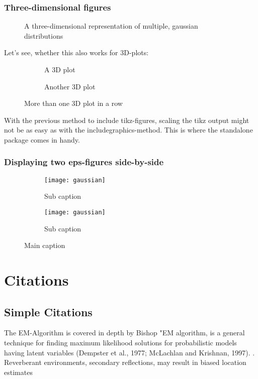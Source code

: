 \subsubsection{Three-dimensional figures}
\begin{figure}[H]
	\centering
	
	\caption{A three-dimensional representation of multiple, gaussian distributions}
	\label{fig:gaussian}
\end{figure}

Let's see, whether this also works for 3D-plots:

\begin{figure}[H]
	\centering
	\begin{subfigure}{0.49\textwidth}
		
		\caption{A 3D plot}
	\end{subfigure}
	\begin{subfigure}{0.49\textwidth}
		
		\caption{Another 3D plot}
	\end{subfigure}
	\caption{More than one 3D plot in a row}
	\label{fig:gaussian3}
\end{figure}

With the previous method to include tikz-figures, scaling the tikz output might not be as easy as with the includegraphics-method. This is where the standalone package comes in handy.

\subsubsection{Displaying two eps-figures side-by-side}
\begin{figure}[H]
 \centering
 \begin{subfigure}{0.49\textwidth}
    \texttt{[image: gaussian]}
    \caption{Sub caption}
 \end{subfigure}
 \begin{subfigure}{0.49\textwidth}
    \texttt{[image: gaussian]}
    \caption{Sub caption}
 \end{subfigure}
 \caption{Main caption}
\end{figure}

\newpage
\section{Citations}
\subsection{Simple Citations}
The EM-Algorithm is covered in depth by Bishop "EM algorithm, is a general technique for finding maximum likelihood solutions for probabilistic models having latent variables (Dempster et al., 1977; McLachlan and Krishnan, 1997). \cite[p. 472]{Bishop2006}. Reverberant environments, secondary reflections, may result in biased location estimates \cite[p.1]{Schwartz2014}